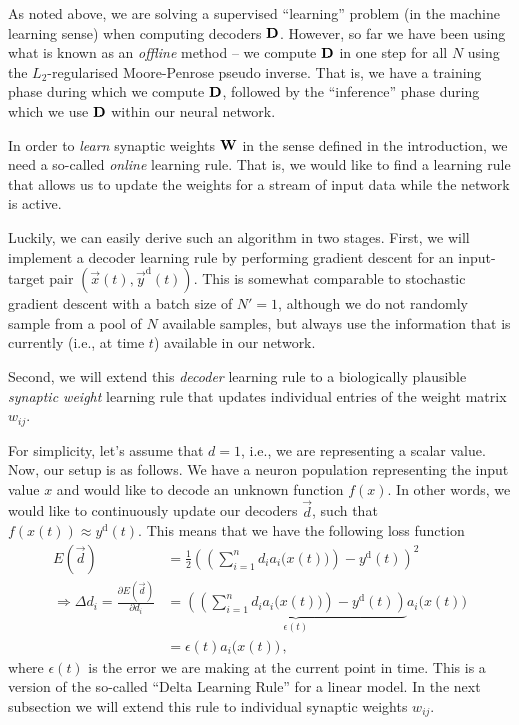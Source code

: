\documentclass[10pt,letterpaper,oneside]{article}
\begin{document}
As noted above, we are solving a supervised \enquote{learning} problem (in the machine learning sense) when computing decoders ${\mathbf{D}}$. However, so far we have been using what is known as an \emph{offline} method -- we compute ${\mathbf{D}}$ in one step for all $N$ using the $L_2$-regularised Moore-Penrose pseudo inverse. That is, we have a training phase during which we compute ${\mathbf{D}}$, followed by the \enquote{inference} phase during which we use ${\mathbf{D}}$ within our neural network.

In order to \emph{learn} synaptic weights ${\mathbf{W}}$ in the sense defined in the introduction, we need a so-called \emph{online} learning rule. That is, we would like to find a learning rule that allows us to update the weights for a stream of input data while the network is active.

Luckily, we can easily derive such an algorithm in two stages. First, we will implement a decoder learning rule by performing gradient descent for an input-target pair $(\vec x(t), \vec y^\mathrm{d}(t))$. This is somewhat comparable to stochastic gradient descent with a batch size of $N' = 1$, although we do not randomly sample from a pool of $N$ available samples, but always use the information that is currently (i.e., at time $t$) available in our network.

Second, we will extend this \emph{decoder} learning rule to a biologically plausible \emph{synaptic weight} learning rule that updates individual entries of the weight matrix $w_{ij}$.

For simplicity, let's assume that $d = 1$, i.e., we are representing a scalar value. Now, our setup is as follows. We have a neuron population representing the input value $x$ and would like to decode an unknown function $f(x)$. In other words, we would like to continuously update our decoders $\vec d$, such that $f(x(t)) \approx y^\mathrm{d}(t)$. This means that we have the following loss function
\begin{align*}
	E(\vec d) &= \frac{1}2 \left(\left(\sum_{i = 1}^n d_i a_i\big(x(t)\big) \right) - y^\mathrm{d}(t) \right)^2 \\
	\Rightarrow \Delta d_i = \frac{\partial E(\vec d)}{\partial d_i} &= \underbrace{\left(\left(\sum_{i = 1}^n d_i a_i\big(x(t)\big) \right) - y^\mathrm{d}(t)\right)}_{\epsilon(t)} a_i\big(x(t)\big) \\
		&= \epsilon(t) a_i\big(x(t)\big) \,,
\end{align*}
where $\epsilon(t)$ is the error we are making at the current point in time. This is a version of the so-called \enquote{Delta Learning Rule} for a linear model. In the next subsection we will extend this rule to individual synaptic weights $w_{ij}$.
\end{document}
